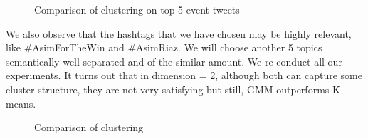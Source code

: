 \begin{figure}[ht]
    \centering
    \qquad
    \caption{Comparison of clustering on top-5-event tweets}
    \label{GMM-top-5}
\end{figure}

We also observe that the hashtags that we have chosen may be highly relevant, like \#AsimForTheWin and \#AsimRiaz. We will choose another 5 topics semantically well separated and of the similar amount. We re-conduct all our experiments. It turns out that in dimension = 2, although both can capture some cluster structure, they are not very satisfying but still, GMM outperforms K-means.

\begin{figure}[H]
    \centering
    \qquad
    \caption{Comparison of clustering}
    \label{Final}
\end{figure}